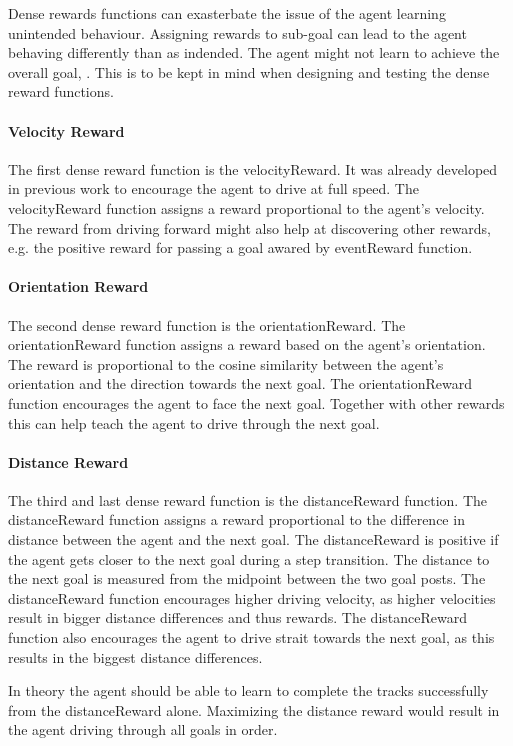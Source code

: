 Dense rewards functions can exasterbate the issue of the agent learning unintended behaviour. Assigning rewards to sub-goal can lead to the agent behaving differently than as indended. The agent might not learn to achieve the overall goal, \textcite{rlbook2020}. This is to be kept in mind when designing and testing the dense reward functions.


\paragraph{Velocity Reward}
The first dense reward function is the velocityReward. It was already developed in previous work \textcite{maximilian} to encourage the agent to drive at full speed. The velocityReward function assigns a reward proportional to the agent's velocity. The reward from driving forward might also help at discovering other rewards, e.g. the positive reward for passing a goal awared by eventReward function.

\paragraph{Orientation Reward}
The second dense reward function is the orientationReward. The orientationReward function assigns a reward based on the agent's orientation. The reward is proportional to the cosine similarity between the agent's orientation and the direction towards the next goal. The orientationReward function encourages the agent to face the next goal. Together with other rewards this can help teach the agent to drive through the next goal.

\paragraph{Distance Reward}
The third and last dense reward function is the distanceReward function. The distanceReward function assigns a reward proportional to the difference in distance between the agent and the next goal. The distanceReward is positive if the agent gets closer to the next goal during a step transition. The distance to the next goal is measured from the midpoint between the two goal posts. The distanceReward function encourages higher driving velocity, as higher velocities result in bigger distance differences and thus rewards. The distanceReward function also encourages the agent to drive strait towards the next goal, as this results in the biggest distance differences. 

In theory the agent should be able to learn to complete the tracks successfully from the distanceReward alone. Maximizing the distance reward would result in the agent driving through all goals in order.

